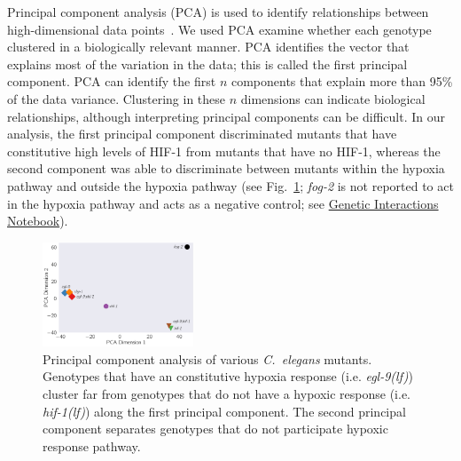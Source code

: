 \documentclass[9pt,twocolumn,twoside]{pnas-new}
\newcommand{\cel}{\emph{C.~elegans}}
\newcommand{\gene}[1]{\mbox{\emph{#1}}}
\newcommand{\fog}{\gene{fog-2(lf)}}
\newcommand{\egl}{\gene{egl-9(lf)}}
\newcommand{\rhy}{\gene{rhy-1(lf)}}
\newcommand{\vhl}{\gene{vhl-1(lf)}}
\newcommand{\eglvhl}{\gene{egl-9(lf); vhl-1(lf)}}
\newcommand{\eglhif}{\gene{egl-9(lf) hif-1(lf)}}
\newcommand{\hif}{\gene{hif-1(lf)}}
\newcommand{\hifp}{HIF-1}
\begin{document}
Principal component analysis (PCA) is used to identify relationships between
high-dimensional data points~\cite{Yeung2001}. We used PCA
examine whether each genotype clustered in a biologically relevant manner. PCA
identifies the vector that explains most of the variation in the data; this
is called the first principal component. PCA can identify the first
$n$ components that explain more than 95\% of the data variance.
Clustering in these $n$ dimensions can indicate biological
relationships, although interpreting principal components can be
difficult.
In our analysis, the first principal component discriminated mutants
that have constitutive high levels of \hifp{} from mutants that have no \hifp{},
whereas the second component was able to discriminate between mutants within the
hypoxia pathway and outside the hypoxia pathway (see Fig.~\ref{fig:pca};
\gene{fog-2} is not reported to act in the hypoxia pathway and acts as a
negative control; see
\href{https://wormlabcaltech.github.io/mprsq/analysis_notebooks/2_predict_interactions.html}
{Genetic Interactions Notebook}).

\begin{figure}[tbhp]
  \centering
  \includegraphics[width=0.4\textwidth]{../figs/pca.pdf}
  \caption{
    Principal component analysis of various \cel{} mutants. Genotypes that have
    an constitutive hypoxia response (i.e. \egl{}) cluster far from genotypes
    that do not have a hypoxic response (i.e. \hif{}) along the first principal
    component. The second principal component separates genotypes that do not
    participate hypoxic response pathway.
  }
\label{fig:pca}
\end{figure}
\end{document}
